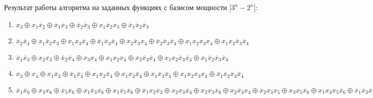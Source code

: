 \documentclass[a4paper,12pt,titlepage,finall]{article}
\begin{document}
Результат работы алгоритма на заданных функциях с базисом мощности $ \left| 3^n - 2^n \right| $:
\begin{enumerate}
    \item $ x_3 \oplus x_1 \overline x_2 \oplus \overline x_1 \overline x_3 \oplus \overline x_2 \overline x_3 \oplus x_1 \overline x_2 x_3 \oplus \overline x_1 \overline x_2 \overline x_3 $
    \item $ \overline x_2 \overline x_4 \oplus x_1 \overline x_2 x_3 \oplus x_1 x_3 \overline x_4 \oplus \overline x_1 \overline x_3 \overline x_4 \oplus x_2 \overline x_3 x_4 \oplus \overline x_2 \overline x_3 \overline x_4 \oplus x_1 x_2 x_3 x_4 \oplus x_1 x_2 \overline x_3 \overline x_4 $
    \item $ \overline x_1 \overline x_3 \oplus x_2 x_3 \oplus \overline x_2 \overline x_4 \oplus x_3 x_4 \oplus x_1 x_2 x_4 \oplus x_2 \overline x_3 \overline x_4 \oplus x_1 x_2 \overline x_3 \overline x_4 \oplus x_1 \overline x_2 \overline x_3 \overline x_4 $
    \item $ x_3 \oplus x_4 \oplus x_1 \overline x_2 \oplus \overline x_1 \overline x_4 \oplus x_1 x_2 \overline x_4 \oplus x_1 x_3 \overline x_4 \oplus x_1 \overline x_3 \overline x_4 \oplus x_1 x_2 x_3 x_4 \oplus \overline x_1 \overline x_2 \overline x_3 \overline x_4 $
    \item $ \overline x_1 \overline x_6 \oplus x_3 x_6 \oplus \overline x_5 \overline x_6 \oplus x_1 \overline x_3 \overline x_6 \oplus x_1 \overline x_5 \overline x_6 \oplus \overline x_1 x_2 \overline x_3 \oplus x_2 x_3 \overline x_4 \oplus x_2 x_3 \overline x_6 \oplus x_2 \overline x_3 x_4 \oplus \overline x_2 x_3 x_5 \oplus x_3 x_5 \overline x_6 \oplus x_1 x_3 x_5 \overline x_6 \oplus \overline x_1 \overline x_3 \overline x_5 \overline x_6 \oplus x_2 x_3 x_4 x_5 \oplus x_2 \overline x_3 \overline x_5 \overline x_6 \oplus x_1 \overline x_2 x_3 \overline x_4 x_5 \overline x_6 $
\end{enumerate}
\end{document}
